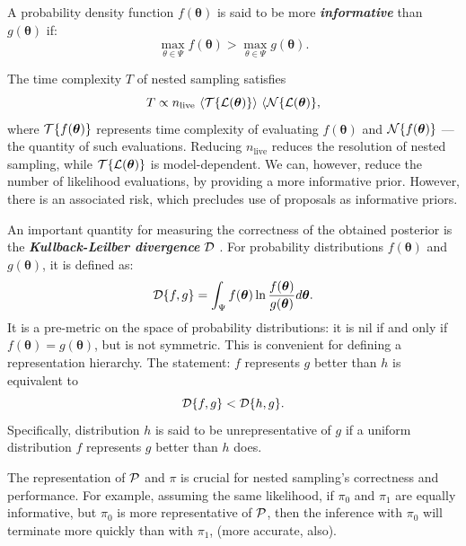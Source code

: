 \documentclass[usenatbib]{mnras}
\begin{document}
A probability density function \(f(\bm{\theta})\) is said to be more
\emph{\textbf{informative}} than \(g(\bm{\theta})\) if:
\begin{equation}
  \label{eq:informative}
  \max_{\theta\in\Psi} f(\bm{\theta}) > \max_{\theta\in\Psi} g(\bm{\theta}).
\end{equation}

The time complexity $T$ of nested sampling satisfies
\begin{equation}\label{eq:complexity}
  T \propto  n_\text{live}\  \langle {\cal T}\{{\cal L}(\bm{\theta})\} \rangle \ \langle  {\cal N}\{{\cal L}(\bm{\theta}) \}, 
\end{equation}
where ${\cal T}\{f(\bm{\theta})\}$ represents time complexity of
evaluating $f(\bm{\theta})$ and ${\cal N}\{f(\bm{\theta})\}$ --- the
quantity of such evaluations. Reducing $n_\text{live}$ reduces the
resolution of nested sampling, while
$ {\cal T}\{{\cal L}(\bm{\theta})\}$ is model-dependent. We can,
however, reduce the number of likelihood evaluations, by providing a
more informative prior. However, there is an associated risk, which
precludes use of proposals as informative priors.

An important quantity for measuring the correctness of the obtained
posterior is the \textbf{\emph{Kullback-Leilber divergence}} ${\cal D}$
\citep{Kullback_1951}. For probability distributions
\(f(\bm{\theta})\) and \(g(\bm{\theta})\), it is defined as:
\begin{equation}
  \label{eq:kl-def}
  {\cal D}\{f, g \} = \int_{\Psi}f(\bm{\theta}) \ln \frac{f(\bm{\theta})}{g(\bm{\theta})} d \bm{\theta}.
\end{equation}
It is a pre-metric on the space of probability distributions: it is
nil if and only if $f(\bm{\theta}) = g(\bm{\theta})$, but is not
symmetric. This is convenient for defining a representation
hierarchy. The statement: $f$ represents $g$ better than $h$ is
equivalent to
\begin{equation}
  \label{eq:hierarchy}
  {\cal D}\{f, g\} < {\cal D}\{h, g\}.
\end{equation}
Specifically, distribution $h$ is said to be unrepresentative of $g$
if a uniform distribution $f$ represents $g$ better than $h$ does.

The representation of ${\cal P}$ and $\pi$ is crucial for nested
sampling's correctness and performance. For example, assuming the same
likelihood, if $\pi_{0}$ and $\pi_{1}$ are equally informative, but
$\pi_{0}$ is more representative of ${\cal P}$, then the inference
with $\pi_{0}$ will terminate more quickly than with $\pi_{1}$, (more
accurate, also).
\end{document}
